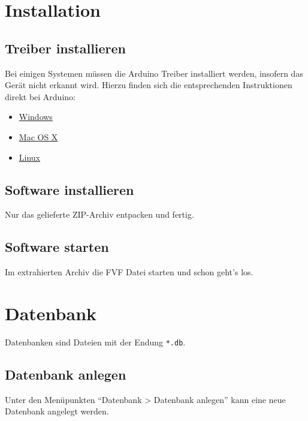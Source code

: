 \documentclass[11pt,accentcolor=tud2a,colorback,noheadingspace]{tudreport}
\begin{document}
\chapter{Installation}
\label{installation:installation}
\label{installation::doc}

\section{Treiber installieren}
\label{installation:treiber-installieren}
Bei einigen Systemen müssen die Arduino Treiber installiert werden, insofern 
das Gerät nicht erkannt wird. Hierzu finden sich die entsprechenden Instruktionen 
direkt bei Arduino:

\begin{itemize}
\item {} 
\href{http://www.arduino.cc/en/Guide/Windows}{Windows}

\item {} 
\href{http://www.arduino.cc/en/Guide/MacOSX}{Mac OS X}

\item {} 
\href{http://www.arduino.cc/playground/Learning/Linux}{Linux}

\end{itemize}


\section{Software installieren}
\label{installation:software-installieren}\label{installation:linux}
Nur das gelieferte ZIP-Archiv entpacken und fertig.


\section{Software starten}
\label{installation:software-starten}
Im extrahierten Archiv die FVF Datei starten und schon geht's los.


\chapter{Datenbank}
\label{database:datenbank}\label{database::doc}
Datenbanken sind Dateien mit der Endung \texttt{*.db}.


\section{Datenbank anlegen}
\label{database:datenbank-anlegen}
Unter den Menüpunkten ``Datenbank \textgreater{} Datenbank anlegen'' 
kann eine neue Datenbank angelegt werden.
\end{document}
